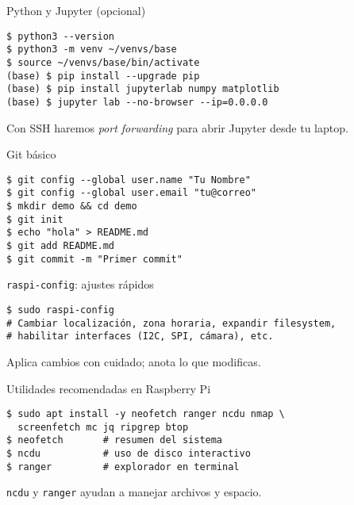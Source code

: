 \documentclass[aspectratio=169,professionalfonts]{beamer}
\begin{document}
\begin{frame}[fragile]{Python y Jupyter (opcional)}
\begin{verbatim}
$ python3 --version
$ python3 -m venv ~/venvs/base
$ source ~/venvs/base/bin/activate
(base) $ pip install --upgrade pip
(base) $ pip install jupyterlab numpy matplotlib
(base) $ jupyter lab --no-browser --ip=0.0.0.0
\end{verbatim}
\begin{infobox}
Con SSH haremos \textit{port forwarding} para abrir Jupyter desde tu laptop.
\end{infobox}
\end{frame}

\begin{frame}[fragile]{Git básico}
\begin{verbatim}
$ git config --global user.name "Tu Nombre"
$ git config --global user.email "tu@correo"
$ mkdir demo && cd demo
$ git init
$ echo "hola" > README.md
$ git add README.md
$ git commit -m "Primer commit"
\end{verbatim}
\end{frame}

\begin{frame}[fragile]{\texttt{raspi-config}: ajustes rápidos}
\begin{verbatim}
$ sudo raspi-config
# Cambiar localización, zona horaria, expandir filesystem,
# habilitar interfaces (I2C, SPI, cámara), etc.
\end{verbatim}
\begin{warnbox}
Aplica cambios con cuidado; anota lo que modificas.
\end{warnbox}
\end{frame}

\begin{frame}[fragile]{Utilidades recomendadas en Raspberry Pi}
\begin{verbatim}
$ sudo apt install -y neofetch ranger ncdu nmap \
  screenfetch mc jq ripgrep btop
$ neofetch       # resumen del sistema
$ ncdu           # uso de disco interactivo
$ ranger         # explorador en terminal
\end{verbatim}
\begin{infobox}
\texttt{ncdu} y \texttt{ranger} ayudan a manejar archivos y espacio.
\end{infobox}
\end{frame}
\end{document}
